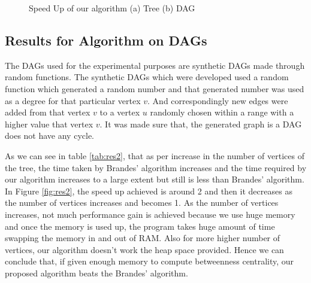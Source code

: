 \begin{figure}[h]

\caption{Speed Up of our algorithm (a) Tree (b) DAG}
\label{fig:tree1}
\end{figure}


\subsection{Results for Algorithm on DAGs}
The DAGs used for the experimental purposes are synthetic DAGs made through random functions.
The synthetic DAGs which were developed used a random function which generated a random number and that generated number was used as a degree for that particular vertex $v$. And correspondingly new edges were added from that vertex $v$ to a vertex $u$ randomly chosen within a range with a higher value that vertex $v$. It was made sure that, the generated graph is a DAG does not have any cycle.

As we can see in table \ref{tab:res2}, that as per increase in the number of vertices of the tree, the time taken by Brandes' algorithm increases and the time required by our algorithm increases to a large extent but still is less than Brandes' algorithm.
In Figure \ref{fig:res2}, the speed up achieved is around 2 and then it decreases as the number of vertices increases and becomes 1.
As the number of vertices increases, not much performance gain is achieved because we use huge memory and once the memory is used up, the program takes huge amount of time swapping the memory in and out of RAM. Also for more higher number of vertices, our algorithm doesn't work the heap space provided.
Hence we can conclude that, if given enough memory to compute betweenness centrality, our proposed algorithm beats the Brandes' algorithm.



